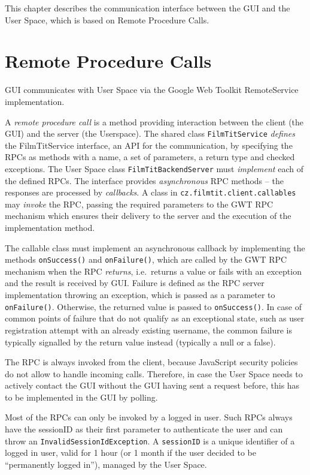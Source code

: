 \label{chap:communication}
\label{sec:communication}

This chapter describes the communication interface between the GUI and the User Space, which is based on Remote Procedure Calls.

\section{Remote Procedure Calls}
\label{sec:rpc:rpc}

GUI communicates with User Space via the Google Web Toolkit RemoteService implementation.

A \emph{remote procedure call} is a method providing interaction between the client (the GUI) and the server (the Userspace). The shared class {\tt FilmTitService} \emph{defines} the FilmTitService interface, an API for the communication, by specifying the RPCs as methods with a name, a set of parameters, a return type and checked exceptions. The User Space class {\tt FilmTitBackendServer} must \emph{implement} each of the defined RPCs. The interface provides \emph{asynchronous} RPC methods -- the responses are processed by \emph{callbacks}. A class in {\tt cz.filmtit.client.callables} may \emph{invoke} the RPC, passing the required parameters to the GWT RPC mechanism which ensures their delivery to the server and the execution of the implementation method.

The callable class must implement an asynchronous callback by implementing the methods {\tt onSuccess()} and {\tt onFailure()}, which are called by the GWT RPC mechanism when the RPC \emph{returns}, i.e.\ returns a value or fails with an exception and the result is received by GUI. Failure is defined as the RPC server implementation throwing an exception, which is passed as a parameter to {\tt onFailure()}. Otherwise, the returned value is passed to {\tt onSuccess()}.
In case of common points of failure that do not qualify as an exceptional state, such as user registration attempt with an already existing username, the common failure is typically signalled by the return value instead (typically a null or a false).

The RPC is always invoked from the client, because JavaScript security policies do not allow to handle incoming calls.
Therefore, in case the User Space needs to actively contact the GUI without the GUI having sent a request before,
this has to be implemented in the GUI by polling.

Most of the RPCs can only be invoked by a logged in user. Such RPCs always have the sessionID as their first parameter to authenticate the user and can throw an {\tt InvalidSessionIdException}.
A {\tt sessionID} is a unique identifier of a logged in user, valid for 1 hour (or 1 month if the user decided to be ``permanently logged in''), managed by the User Space.

